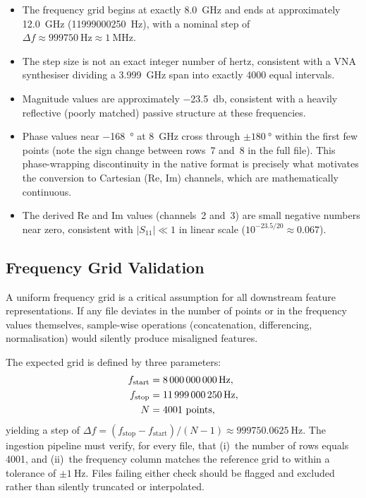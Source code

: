 \begin{itemize}
    \item The frequency grid begins at exactly \SI{8.0}{\giga\hertz} and
        ends at approximately \SI{12.0}{\giga\hertz}
        (\SI{11999000250}{\hertz}), with a nominal step of
        $\Delta f \approx \SI{999750}{\hertz} \approx \SI{1}{\mega\hertz}$.
    \item The step size is not an exact integer number of hertz,
        consistent with a VNA synthesiser dividing a
        \SI{3.999}{\giga\hertz} span into exactly \num{4000} equal
        intervals.
    \item Magnitude values are approximately \SI{-23.5}{\decibel},
        consistent with a heavily reflective (poorly matched) passive
        structure at these frequencies.
    \item Phase values near \SI{-168}{\degree} at \SI{8}{\giga\hertz}
        cross through $\pm\SI{180}{\degree}$ within the first few points
        (note the sign change between rows~7 and~8 in the full file).
        This phase-wrapping discontinuity in the native format is
        precisely what motivates the conversion to Cartesian
        ($\text{Re}$, $\text{Im}$) channels, which are mathematically
        continuous.
    \item The derived Re and Im values (channels~2 and~3) are small
        negative numbers near zero, consistent with $|S_{11}| \ll 1$ in
        linear scale ($10^{-23.5/20} \approx 0.067$).
\end{itemize}

\subsection{Frequency Grid Validation}
\label{sec:dataset:freqgrid}

A uniform frequency grid is a critical assumption for all downstream
feature representations.  If any file deviates in the number of points or
in the frequency values themselves, sample-wise operations
(concatenation, differencing, normalisation) would silently produce
misaligned features.

The expected grid is defined by three parameters:
\begin{align}
    f_{\text{start}} &= \SI{8\,000\,000\,000}{\hertz},\notag\\
    f_{\text{stop}}  &= \SI{11\,999\,000\,250}{\hertz},\notag\\
    N &= 4001 \text{ points},
    \label{eq:freq_grid}
\end{align}
yielding a step of $\Delta f = (f_{\text{stop}} - f_{\text{start}}) /
(N-1) \approx \SI{999750.0625}{\hertz}$.  The ingestion pipeline must
verify, for every file, that (i)~the number of rows equals \num{4001},
and (ii)~the frequency column matches the reference grid to within a
tolerance of $\pm\SI{1}{\hertz}$.  Files failing either check should be
flagged and excluded rather than silently truncated or interpolated.

